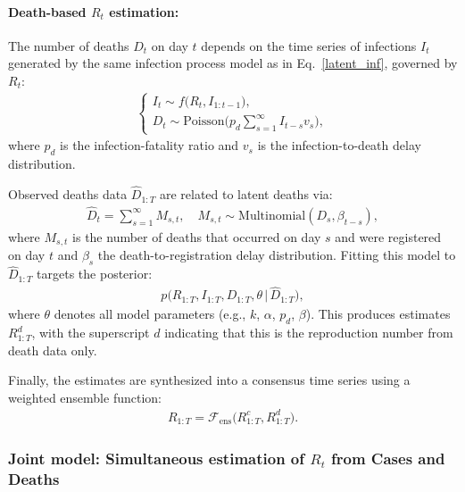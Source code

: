 \documentclass{article}
\begin{document}
\paragraph{Death-based $R_{t}$ estimation:}
The number of deaths $D_t$ on day $t$ depends on the time series of infections $I_{t}$ generated by the same infection process model as in Eq.~\eqref{latent_inf}, governed by $R_{t}$:
\begin{align}\label{latent_death}
\begin{cases}
I_t \sim f\big(R_t, I_{1:t-1}\big),\\[4pt]
D_t \sim \mathrm{Poisson}\!\Big( p_d \sum_{s=1}^\infty I_{t-s} v_s \Big),
\end{cases}
\end{align}
where $p_d$ is the infection-fatality ratio and $v_s$ is the infection-to-death delay distribution.

Observed deaths data $\widehat{D}_{1:T}$ are related to latent deaths via:
\begin{align}\label{obs_death}
\widehat{D}_t = \sum_{s=1}^\infty M_{s,t}, \quad M_{s,t} \sim \mathrm{Multinomial}(D_s, \beta_{t-s}),
\end{align}
where $M_{s,t}$ is the number of deaths that occurred on day $s$ and were registered on day $t$ and $\beta_s$ the death-to-registration delay distribution.  
Fitting this model to $\widehat{D}_{1:T}$ targets the posterior:
\begin{align}
p\big(R_{1:T}, I_{1:T}, D_{1:T}, \theta \,\big|\, \widehat{D}_{1:T}\big),
\end{align}
where $\theta$ denotes all model parameters (e.g., $k$, $\alpha$, $p_d$, $\beta$).  
This produces estimates $R_{1:T}^d$, with the superscript $d$ indicating that this is the reproduction number from death data only.

Finally, the estimates are synthesized into a consensus time series using a weighted ensemble function:
\begin{align}
R_{1:T} = \mathcal{F}_{\mathrm{ens}}\big(R_{1:T}^c, R_{1:T}^d\big).
\end{align}

\subsubsection{Joint model: Simultaneous estimation of $R_{t}$ from Cases and Deaths}
\end{document}
